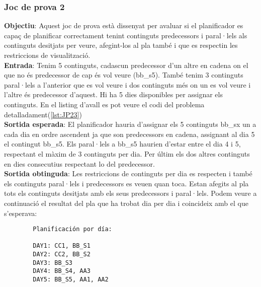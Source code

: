 \documentclass[a4paper]{article}
\begin{document}
	\subsubsection{Joc de prova 2}
	\textbf{Objectiu}: Aquest joc de prova està dissenyat per avaluar si el planificador es capaç de planificar correctament tenint continguts predecessors i paral·lels als continguts desitjats per veure, afegint-los al pla també i que es respectin les restriccions de visualització. \\
	\textbf{Entrada}: Tenim 5 continguts, cadascun predecessor d'un altre en cadena on el que no és predecessor de cap és vol veure (bb\_s5). També tenim 3 continguts paral·lels a l'anterior que es vol veure i dos continguts més on un es vol veure i l'altre és predecessor d'aquest. Hi ha 5 dies disponibles per assignar els continguts. En el listing d'avall es pot veure el codi del problema detalladament(\ref{lst:JP23})\\
	\textbf{Sortida esperada}: El planificador hauria d'assignar els 5 continguts bb\_sx un a cada dia en ordre ascendent ja que son predecessors en cadena, assignant al dia 5 el contingut bb\_s5. Els paral·lels a bb\_s5 haurien d'estar entre el dia 4 i 5, respectant el màxim de 3 continguts per dia. Per últim els dos altres continguts en dies consecutius respectant lo del predecessor.\\
	\textbf{Sortida obtinguda}: Les restriccions de continguts per dia es respecten i també els continguts paral·lels i predecessors es veuen quan toca. Estan afegits al pla tots els continguts desitjats amb els seus predecessors i paral·lels. Podem veure a continuació el resultat del pla que ha trobat dia per dia i coincideix amb el que s'esperava:
	
	\begin{verbatim}
		Planificación por día:
		
		DAY1: CC1, BB_S1
		DAY2: CC2, BB_S2
		DAY3: BB_S3
		DAY4: BB_S4, AA3
		DAY5: BB_S5, AA1, AA2
		
	\end{verbatim}
	
\end{document}
